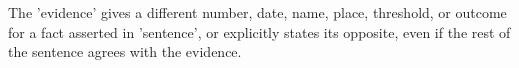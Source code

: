 The 'evidence' gives a different number, date, name, place, threshold, or outcome for a fact asserted in 'sentence', or explicitly states its opposite, even if the rest of the sentence agrees with the evidence.
